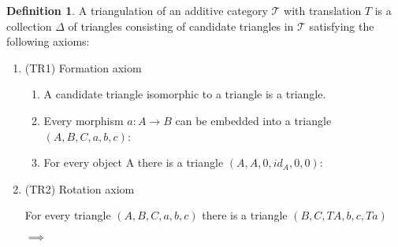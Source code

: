 \documentclass[12pt]{article}
\theoremstyle{definition}
\newtheorem{definition}{Definition}[section]
\theoremstyle{remark}
\begin{document}
            \begin{definition}
                A triangulation of an additive category $\mathcal{T}$ with translation $T$ is a collection $\Delta$ of triangles consisting of candidate triangles in $\mathcal{T}$ satisfying the following axioms: 

                \begin{enumerate}
                    \item (TR1) Formation axiom

                        \begin{enumerate}
                            \item A candidate triangle isomorphic to a triangle is a triangle.
                            \item Every morphism $a : A \rightarrow B$ can be embedded into a triangle $(A,B,C,a,b,c)$:
                            \begin{center}
                            \end{center}
                            \item For every object A there is a triangle $(A,A,0,id_A,0,0)$:
                            \begin{center}
                            \end{center}
                        \end{enumerate}
                    \item (TR2) Rotation axiom

                        For every triangle $(A,B,C,a,b,c)$ there is a triangle $(B,C,TA,b,c,Ta)$
                        \begin{center}
                             $\implies$
                            

\end{center}
\end{enumerate}
\end{definition}
\end{document}
